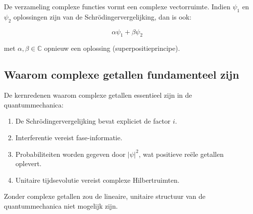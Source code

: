 \documentclass{report} %
\begin{document}
    De verzameling complexe functies vormt een complexe vectorruimte. Indien $\psi_1$ en $\psi_2$ oplossingen zijn van de Schrödingervergelijking, dan is ook:

    \[
        \alpha \psi_1 + \beta \psi_2
    \]

    met $\alpha,\beta \in \mathbb{C}$ opnieuw een oplossing (superpositieprincipe).

    \subsection{Waarom complexe getallen fundamenteel zijn}

    De kernredenen waarom complexe getallen essentieel zijn in de quantummechanica:

    \begin{enumerate}
        \item De Schrödingervergelijking bevat expliciet de factor $i$.
        \item Interferentie vereist fase-informatie.
        \item Probabiliteiten worden gegeven door $|\psi|^2$, wat positieve reële getallen oplevert.
        \item Unitaire tijdsevolutie vereist complexe Hilbertruimten.
    \end{enumerate}

    Zonder complexe getallen zou de lineaire, unitaire structuur van de quantummechanica niet mogelijk zijn.
\end{document}
